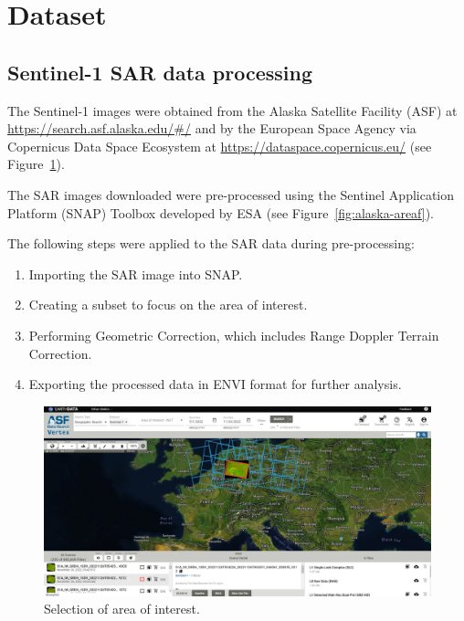 \section{Dataset}
\subsection{Sentinel-1 SAR data processing}
The Sentinel-1 images were obtained from the Alaska Satellite Facility (ASF) at \url{https://search.asf.alaska.edu/#/} and by the European Space Agency via Copernicus Data Space Ecosystem at \url{https://dataspace.copernicus.eu/} (see Figure~\ref{fig:alaska-area1}).

The SAR images downloaded were pre-processed using the Sentinel Application Platform (SNAP) Toolbox developed by ESA (see Figure~\ref{fig:alaska-areaf}). 

The following steps were applied to the SAR data during pre-processing:

\begin{enumerate}
    \item Importing the SAR image into SNAP.
    \item Creating a subset to focus on the area of interest.
    \item Performing Geometric Correction, which includes Range Doppler Terrain Correction.
    \item Exporting the processed data in ENVI format for further analysis.
\end{enumerate}



\begin{figure}[H]
    \centering
    \includegraphics[width=1\textwidth]{../../Images/PNG/alaska1.png}
    \caption[Selection of area of interest]{Selection of area of interest.}
    \label{fig:alaska-area1}
\end{figure}


